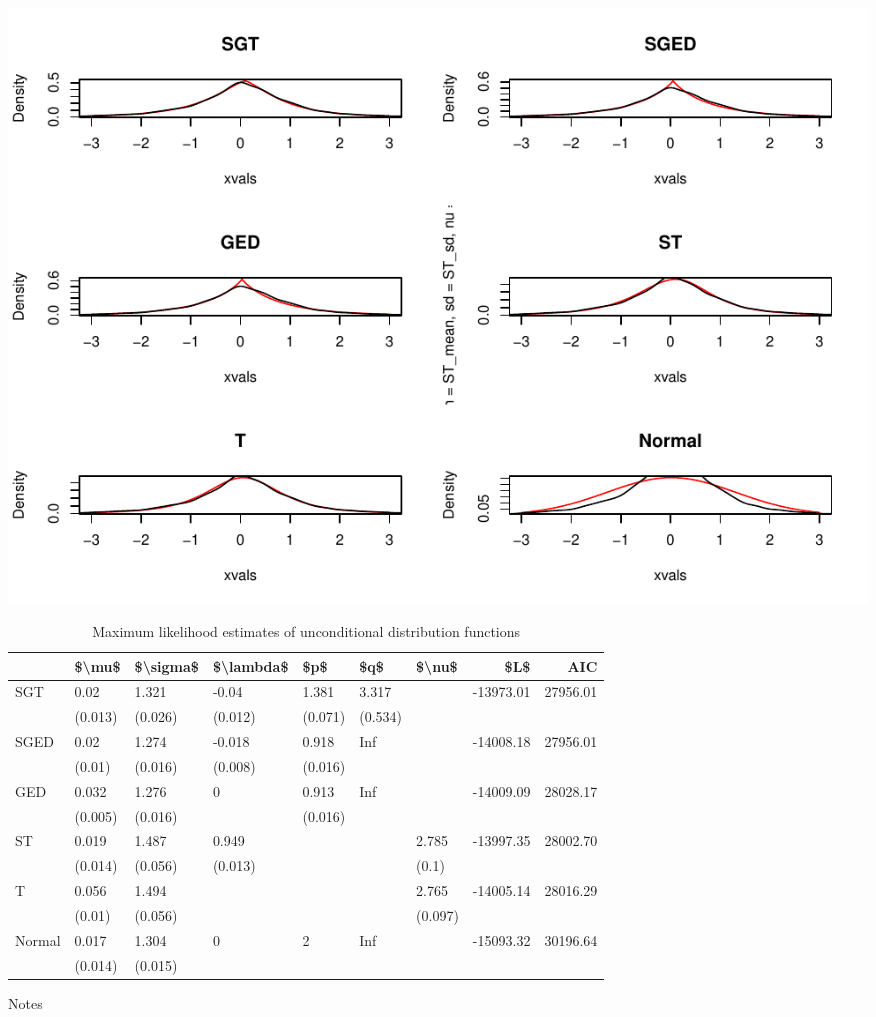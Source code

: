 \documentclass[a4paper,nobind]{templates/ociamthesis}
\begin{document}
\includegraphics{04-Findings_files/figure-latex/MLE tables for diferent series-1.pdf}

\begin{table}[h!]

\caption{\label{tab:dsTable}Maximum likelihood estimates of unconditional distribution functions}
\centering
\begin{threeparttable}
\begin{tabular}[t]{lllllllrr}
\toprule
 & \$\textbackslash{}mu\$ & \$\textbackslash{}sigma\$ & \$\textbackslash{}lambda\$ & \$p\$ & \$q\$ & \$\textbackslash{}nu\$ & \$L\$ & AIC\\
\midrule
SGT & 0.02 & 1.321 & -0.04 & 1.381 & 3.317 &  & -13973.01 & 27956.01\\
 & (0.013) & (0.026) & (0.012) & (0.071) & (0.534) &  &  & \\
SGED & 0.02 & 1.274 & -0.018 & 0.918 & Inf &  & -14008.18 & 27956.01\\
 & (0.01) & (0.016) & (0.008) & (0.016) &  &  &  & \\
GED & 0.032 & 1.276 & 0 & 0.913 & Inf &  & -14009.09 & 28028.17\\
\addlinespace
 & (0.005) & (0.016) &  & (0.016) &  &  &  & \\
ST & 0.019 & 1.487 & 0.949 &  &  & 2.785 & -13997.35 & 28002.70\\
 & (0.014) & (0.056) & (0.013) &  &  & (0.1) &  & \\
T & 0.056 & 1.494 &  &  &  & 2.765 & -14005.14 & 28016.29\\
 & (0.01) & (0.056) &  &  &  & (0.097) &  & \\
\addlinespace
Normal & 0.017 & 1.304 & 0 & 2 & Inf &  & -15093.32 & 30196.64\\
 & (0.014) & (0.015) &  &  &  &  &  & \\
\bottomrule
\end{tabular}
\begin{tablenotes}
\item Notes
\end{tablenotes}
\end{threeparttable}
\end{table}
\end{document}
